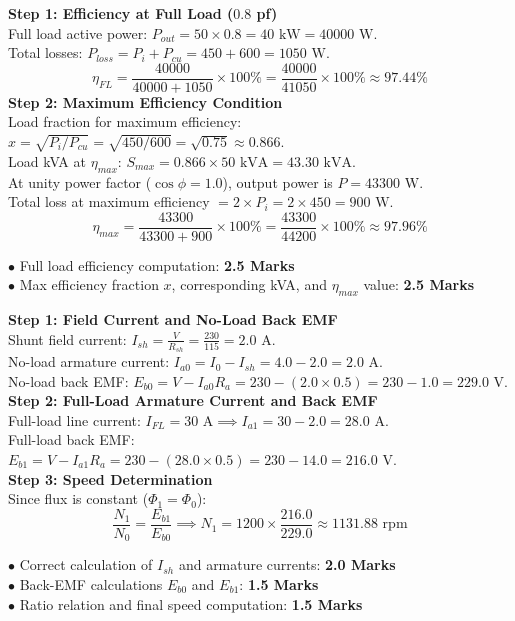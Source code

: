 \begin{solutionbox}
\textbf{Step 1: Efficiency at Full Load ($0.8$ pf)}\\
Full load active power: $P_{out} = 50 \times 0.8 = 40\text{ kW} = 40000\text{ W}$.\\
Total losses: $P_{loss} = P_i + P_{cu} = 450 + 600 = 1050\text{ W}$.\\
\[ \eta_{FL} = \frac{40000}{40000 + 1050} \times 100\% = \frac{40000}{41050} \times 100\% \approx 97.44\% \]
\textbf{Step 2: Maximum Efficiency Condition}\\
Load fraction for maximum efficiency: $x = \sqrt{P_i / P_{cu}} = \sqrt{450 / 600} = \sqrt{0.75} \approx 0.866$.\\
Load kVA at $\eta_{max}$: $S_{max} = 0.866 \times 50\text{ kVA} = 43.30\text{ kVA}$.\\
At unity power factor ($\cos\phi = 1.0$), output power is $P = 43300\text{ W}$.\\
Total loss at maximum efficiency $= 2 \times P_i = 2 \times 450 = 900\text{ W}$.\\
\[ \eta_{max} = \frac{43300}{43300 + 900} \times 100\% = \frac{43300}{44200} \times 100\% \approx 97.96\% \]
\begin{markingrubric}
$\bullet$ Full load efficiency computation: \textbf{2.5 Marks}\\
$\bullet$ Max efficiency fraction $x$, corresponding kVA, and $\eta_{max}$ value: \textbf{2.5 Marks}
\end{markingrubric}
\end{solutionbox}

\begin{solutionbox}
\textbf{Step 1: Field Current and No-Load Back EMF}\\
Shunt field current: $I_{sh} = \frac{V}{R_{sh}} = \frac{230}{115} = 2.0\text{ A}$.\\
No-load armature current: $I_{a0} = I_0 - I_{sh} = 4.0 - 2.0 = 2.0\text{ A}$.\\
No-load back EMF: $E_{b0} = V - I_{a0} R_a = 230 - (2.0 \times 0.5) = 230 - 1.0 = 229.0\text{ V}$.\\
\textbf{Step 2: Full-Load Armature Current and Back EMF}\\
Full-load line current: $I_{FL} = 30\text{ A} \implies I_{a1} = 30 - 2.0 = 28.0\text{ A}$.\\
Full-load back EMF: $E_{b1} = V - I_{a1} R_a = 230 - (28.0 \times 0.5) = 230 - 14.0 = 216.0\text{ V}$.\\
\textbf{Step 3: Speed Determination}\\
Since flux is constant ($\Phi_1 = \Phi_0$):
\[ \frac{N_1}{N_0} = \frac{E_{b1}}{E_{b0}} \implies N_1 = 1200 \times \frac{216.0}{229.0} \approx 1131.88\text{ rpm} \]
\begin{markingrubric}
$\bullet$ Correct calculation of $I_{sh}$ and armature currents: \textbf{2.0 Marks}\\
$\bullet$ Back-EMF calculations $E_{b0}$ and $E_{b1}$: \textbf{1.5 Marks}\\
$\bullet$ Ratio relation and final speed computation: \textbf{1.5 Marks}
\end{markingrubric}
\end{solutionbox}
\newpage
